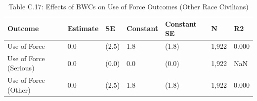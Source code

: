 \begin{table}

\caption{Table C.17: Effects of BWCs on Use of Force Outcomes (Other Race Civilians)}
\centering
\begin{tabular}[t]{lllllll}
\toprule
Outcome & Estimate & SE & Constant & Constant SE & N & R2\\
\midrule
Use of Force & 0.0 & (2.5) & 1.8 & (1.8) & 1,922 & 0.000\\
Use of Force (Serious) & 0.0 & (0.0) & 0.0 & (0.0) & 1,922 & NaN\\
Use of Force (Other) & 0.0 & (2.5) & 1.8 & (1.8) & 1,922 & 0.000\\
\bottomrule
\end{tabular}
\end{table}
